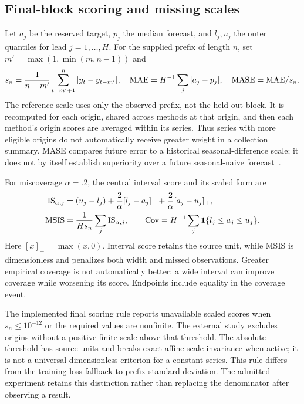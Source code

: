 \subsection{Final-block scoring and missing scales}
\label{sec:scoring}
Let $a_j$ be the reserved target, $p_j$ the median forecast, and $l_j,u_j$ the outer quantiles for lead $j=1,\ldots,H$. For the supplied prefix of length $n$, set $m'=\max(1,\min(m,n-1))$ and
\begin{equation}
 s_n={1\over n-m'}\sum_{t=m'+1}^{n}|y_t-y_{t-m'}|,
 \quad \mathrm{MAE}=H^{-1}\sum_j|a_j-p_j|,
 \quad \mathrm{MASE}=\mathrm{MAE}/s_n.
\end{equation}
The reference scale uses only the observed prefix, not the held-out block. It is recomputed for each origin, shared across methods at that origin, and then each method's origin scores are averaged within its series. Thus series with more eligible origins do not automatically receive greater weight in a collection summary. MASE compares future error to a historical seasonal-difference scale; it does not by itself establish superiority over a future seasonal-naive forecast~\cite{mase}.

For miscoverage $\alpha=.2$, the central interval score and its scaled form are~\cite{proper}
\begin{align}
 \mathrm{IS}_{\alpha,j}&=(u_j-l_j)+{2\over\alpha}[l_j-a_j]_+
                         +{2\over\alpha}[a_j-u_j]_+,\\
 \mathrm{MSIS}&={1\over Hs_n}\sum_j\mathrm{IS}_{\alpha,j},\qquad
 \mathrm{Cov}=H^{-1}\sum_j\mathbf1\{l_j\le a_j\le u_j\}.
\end{align}
Here $[x]_+=\max(x,0)$. Interval score retains the source unit, while MSIS is dimensionless and penalizes both width and missed observations. Greater empirical coverage is not automatically better: a wide interval can improve coverage while worsening its score. Endpoints include equality in the coverage event.

The implemented final scoring rule reports unavailable scaled scores when $s_n\le10^{-12}$ or the required values are nonfinite. The external study excludes origins without a positive finite scale above that threshold. The absolute threshold has source units and breaks exact affine scale invariance when active; it is not a universal dimensionless criterion for a constant series. This rule differs from the training-loss fallback to prefix standard deviation. The admitted experiment retains this distinction rather than replacing the denominator after observing a result.
